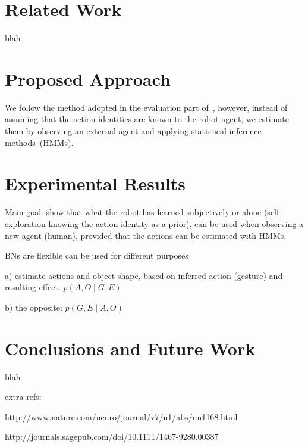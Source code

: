 \documentclass[a4paper]{article}
\begin{document}
\section{Related Work}

blah

\section{Proposed Approach}

We follow the method adopted in the evaluation part of~\cite{salvi:2012:smcb}, however, instead of assuming that the action identities are known to the robot agent, we estimate them by observing an external agent and applying statistical inference methods~(\acp{HMM}).

\section{Experimental Results}

Main goal: show that what the robot has learned subjectively or alone (self-exploration knowing the action identity as a prior), can be used when observing a new agent (human), provided that the actions can be estimated with \acp{HMM}.

\acp{BN} are flexible can be used for different purposes

a) estimate actions and object shape, based on inferred action (gesture) and resulting effect. $p(A, O \mid G, E)$

b) the opposite: $p(G, E \mid A, O)$


\section{Conclusions and Future Work}

blah

extra refs:

http://www.nature.com/neuro/journal/v7/n1/abs/nn1168.html

http://journals.sagepub.com/doi/10.1111/1467-9280.00387

%

\nocite{*} %

%

\end{document}
